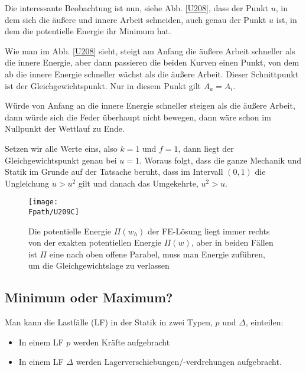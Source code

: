{{{{{Die interessante Beobachtung ist nun, siehe Abb. \ref{U208}, dass der Punkt $u$, in dem sich die \"{a}u{\ss}ere und innere Arbeit schneiden,  auch genau der Punkt $u$ ist, in dem die potentielle Energie ihr Minimum hat.

Wie man im Abb. \ref{U208} sieht, steigt am Anfang die \"{a}u{\ss}ere Arbeit schneller als die innere Energie, aber dann passieren die beiden Kurven einen Punkt, von dem ab die innere Energie schneller w\"{a}chst als die \"{a}u{\ss}ere Arbeit. { Dieser Schnittpunkt ist der Gleichgewichtspunkt}. Nur in diesem Punkt gilt $A_a = A_i$.

W\"{u}rde von Anfang an die innere Energie schneller steigen als die \"{a}u{\ss}ere Arbeit, dann w\"{u}rde sich die Feder \"{u}berhaupt nicht bewegen, dann w\"{a}re schon im Nullpunkt der Wettlauf zu Ende.

Setzen wir alle Werte eins, also $ k = 1$ und $ f = 1 $, dann liegt der Gleich\-gewichtspunkt genau bei $ u = 1$. Woraus folgt, dass die ganze Mechanik und Statik im Grunde auf der Tatsache beruht, dass im Intervall $(0,1)$
die Ungleichung $u > u^2$ gilt und danach das Umgekehrte, $u^2 > u$.

\begin{figure}[tbp]
\centering
\if {} \sidecaption \fi
\texttt{[image: \\Fpath/U209C]}
\caption{Die potentielle Energie $\Pi(w_h)$ der FE-L\"{o}sung liegt
immer rechts von der exakten potentiellen Energie $\Pi(w)$, aber in beiden F\"{a}llen ist $\Pi$ eine nach oben offene Parabel, muss man Energie zuf\"{u}hren, um die Gleichgewichtslage zu verlassen} \label{U209}
\end{figure}%

{\textcolor{sectionTitleBlue}{\subsection{Minimum oder Maximum?}}}
Man kann die Lastf\"{a}lle (LF) in der Statik in zwei Typen, $p$ und $\Delta$, einteilen:\\

\begin{itemize}
  \item In einem LF $p$  werden Kr\"{a}fte aufgebracht
  \item In einem LF $\Delta$ werden Lagerverschiebungen/-verdrehungen aufgebracht.
\end{itemize}

}}}}}
